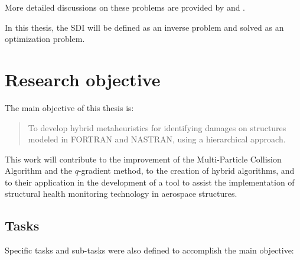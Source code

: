 More detailed discussions on these problems are provided by  and .

In this thesis, the SDI will be defined as an inverse problem and solved as an optimization problem.

\section{Research objective}

The main objective of this thesis is:

\begin{quote}
To develop hybrid metaheuristics for identifying damages on structures modeled in FORTRAN and NASTRAN, using a hierarchical approach.
\end{quote}

This work will contribute to the improvement of the Multi-Particle Collision Algorithm and the $q$-gradient method, to the creation of hybrid algorithms, and to their application in the development of a tool to assist the implementation of structural health monitoring technology in aerospace structures.

\subsection{Tasks}

Specific tasks and sub-tasks were also defined to accomplish the main objective:

